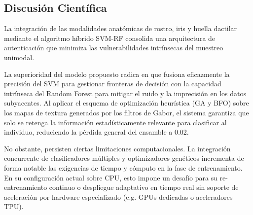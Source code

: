 \subsection{Discusión Científica}
La integración de las modalidades anatómicas de rostro, iris y huella dactilar mediante el algoritmo híbrido SVM-RF consolida una arquitectura de autenticación que minimiza las vulnerabilidades intrínsecas del muestreo unimodal.

La superioridad del modelo propuesto radica en que fusiona eficazmente la precisión del SVM para gestionar fronteras de decisión con la capacidad intrínseca del Random Forest para mitigar el ruido y la imprecisión en los datos subyacentes. Al aplicar el esquema de optimización heurística (GA y BFO) sobre los mapas de textura generados por los filtros de Gabor, el sistema garantiza que solo se retenga la información estadísticamente relevante para clasificar al individuo, reduciendo la pérdida general del ensamble a 0.02.

No obstante, persisten ciertas limitaciones computacionales. La integración concurrente de clasificadores múltiples y optimizadores genéticos incrementa de forma notable las exigencias de tiempo y cómputo en la fase de entrenamiento. En su configuración actual sobre CPU, esto impone un desafío para su re-entrenamiento continuo o despliegue adaptativo en tiempo real sin soporte de aceleración por hardware especializado (e.g. GPUs dedicadas o aceleradores TPU).